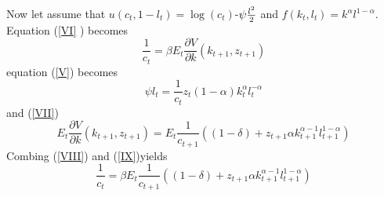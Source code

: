 \documentclass[a4paper,12pt]{article}
\begin{document}
Now let assume that $u\left( c_{t},1-l_{t}\right) =\log (c_{t})$-$\psi \frac{%
l^{2}}{2}$ and $f(k_{t},l_{t})=k^{\alpha }l^{1-\alpha }$. Equation (\ref{VI}%
) becomes 
\begin{equation}
\frac{1}{c_{t}}=\beta E_{t}\frac{\partial V}{\partial k}\left(
k_{t+1},z_{t+1}\right)   \label{VIII}
\end{equation}%
equation (\ref{V}) becomes 
\begin{equation*}
\psi l_{t}=\frac{1}{c_{t}}z_{t}\left( 1-\alpha \right) k_{t}^{\alpha
}l_{t}^{-\alpha }
\end{equation*}%
and (\ref{VII}) 
\begin{equation}
E_{t}\frac{\partial V}{\partial k}\left( k_{t+1},z_{t+1}\right) =E_{t}\frac{1%
}{c_{t+1}}\left( \left( 1-\delta \right) +z_{t+1}\alpha k_{t+1}^{\alpha
-1}l_{t+1}^{1-\alpha }\right)   \label{IX}
\end{equation}%
Combing (\ref{VIII}) and (\ref{IX})yields%
\begin{equation*}
\frac{1}{c_{t}}=\beta E_{t}\frac{1}{c_{t+1}}\left( \left( 1-\delta \right)
+z_{t+1}\alpha k_{t+1}^{\alpha -1}l_{t+1}^{1-\alpha }\right) 
\end{equation*}
\end{document}
